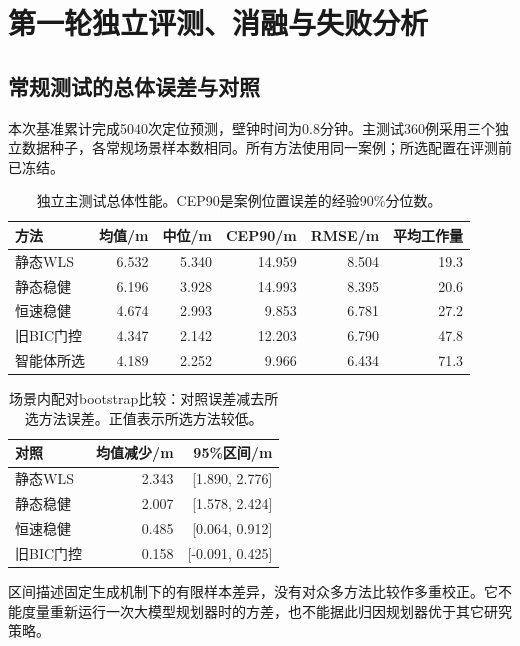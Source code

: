 \section{第一轮独立评测、消融与失败分析}\label{sec:results}

\subsection{常规测试的总体误差与对照}

本次基准累计完成5040次定位预测，壁钟时间为0.8分钟。主测试360例采用三个独立数据种子，各常规场景样本数相同。所有方法使用同一案例；所选配置在评测前已冻结。

\begin{table}[H]\centering\small
\caption{独立主测试总体性能。CEP90是案例位置误差的经验90\%分位数。}

\begin{tabular}{lrrrrr}
\toprule
方法 & 均值/m & 中位/m & CEP90/m & RMSE/m & 平均工作量\\
\midrule
静态WLS & 6.532 & 5.340 & 14.959 & 8.504 & 19.3\\
静态稳健 & 6.196 & 3.928 & 14.993 & 8.395 & 20.6\\
恒速稳健 & 4.674 & 2.993 & 9.853 & 6.781 & 27.2\\
旧BIC门控 & 4.347 & 2.142 & 12.203 & 6.790 & 47.8\\
智能体所选 & 4.189 & 2.252 & 9.966 & 6.434 & 71.3\\
\bottomrule\end{tabular}\end{table}

\begin{table}[H]\centering\small
\caption{场景内配对bootstrap比较：对照误差减去所选方法误差。正值表示所选方法较低。}

\begin{tabular}{lrr}
\toprule
对照 & 均值减少/m & 95\%区间/m\\
\midrule
静态WLS & 2.343 & [1.890, 2.776]\\
静态稳健 & 2.007 & [1.578, 2.424]\\
恒速稳健 & 0.485 & [0.064, 0.912]\\
旧BIC门控 & 0.158 & [-0.091, 0.425]\\
\bottomrule\end{tabular}\end{table}

区间描述固定生成机制下的有限样本差异，没有对众多方法比较作多重校正。它不能度量重新运行一次大模型规划器时的方差，也不能据此归因规划器优于其它研究策略。

